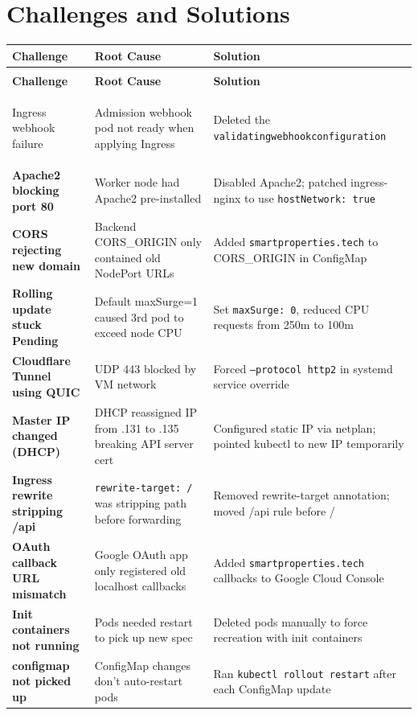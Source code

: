 \documentclass[12pt,a4paper]{report}
\begin{document}
\chapter{Challenges and Solutions}

\begin{longtable}{>{\bfseries}p{4.5cm} p{5cm} p{5cm}}
  \toprule
  \textbf{Challenge} & \textbf{Root Cause} & \textbf{Solution} \\
  \midrule
  \endfirsthead
  \multicolumn{3}{c}{\textit{Continued from previous page}} \\
  \toprule
  \textbf{Challenge} & \textbf{Root Cause} & \textbf{Solution} \\
  \midrule
  \endhead
  \bottomrule
  \endfoot

  Ingress webhook failure & Admission webhook pod not ready when applying Ingress & Deleted the \texttt{validatingwebhookconfiguration} \\[0.3cm]

  Apache2 blocking port 80 & Worker node had Apache2 pre-installed & Disabled Apache2; patched ingress-nginx to use \texttt{hostNetwork: true} \\[0.3cm]

  CORS rejecting new domain & Backend CORS\_ORIGIN only contained old NodePort URLs & Added \texttt{smartproperties.tech} to CORS\_ORIGIN in ConfigMap \\[0.3cm]

  Rolling update stuck Pending & Default maxSurge=1 caused 3rd pod to exceed node CPU & Set \texttt{maxSurge: 0}, reduced CPU requests from 250m to 100m \\[0.3cm]

  Cloudflare Tunnel using QUIC & UDP 443 blocked by VM network & Forced \texttt{--protocol http2} in systemd service override \\[0.3cm]

  Master IP changed (DHCP) & DHCP reassigned IP from .131 to .135 breaking API server cert & Configured static IP via netplan; pointed kubectl to new IP temporarily \\[0.3cm]

  Ingress rewrite stripping /api & \texttt{rewrite-target: /} was stripping path before forwarding & Removed rewrite-target annotation; moved /api rule before / \\[0.3cm]

  OAuth callback URL mismatch & Google OAuth app only registered old localhost callbacks & Added \texttt{smartproperties.tech} callbacks to Google Cloud Console \\[0.3cm]

  Init containers not running & Pods needed restart to pick up new spec & Deleted pods manually to force recreation with init containers \\[0.3cm]

  configmap not picked up & ConfigMap changes don't auto-restart pods & Ran \texttt{kubectl rollout restart} after each ConfigMap update \\

\end{longtable}
\end{document}
